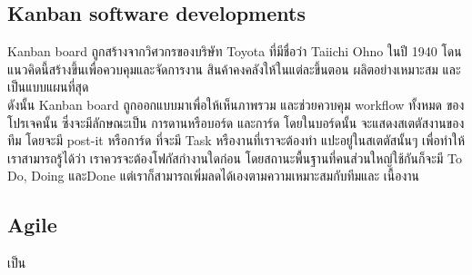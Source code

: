 \documentclass[12pt,oneside,openright,a4paper]{cpe-thai-project}
\begin{document}
\subsection{Kanban software developments} 
\hspace*{1cm}Kanban board \cite{WhatIsKanban, KanbanConcept} ถูกสร้างจากวิศวกรของบริษัท Toyota ที่มีชื่อว่า Taiichi Ohno ในปี 1940 โดนแนวคิดนี้สร้างขึ้นเพื่อควบคุมและจัดการงาน สินค้าคงคลังให้ในแต่ละขึ้นตอน ผลิตอย่างเหมาะสม และเป็นแบบแผนที่สุด\\
\hspace*{1cm}ดังนั้น Kanban board ถูกออกแบบมาเพื่อให้เห็นภาพรวม และช่วยควบคุม workflow ทั้งหมด ของโปรเจคนั้น ซึ่งจะมีลักษณะเป็น การดานหรือบอร์ด และการ์ด โดยในบอร์ดนั้น จะแสดงสเตตัสงานของทีม โดยจะมี post-it หรือการ์ด ที่จะมี Task หรืองานที่เราจะต้องทำ แปะอยู่ในสเตตัสนั้นๆ เพื่อทำให้เราสามารถรู้ได้ว่า เราควรจะต้องโฟกัสกำงานใดก่อน โดยสถานะพื้นฐานที่คนส่วนใหญ่ใช้กันก็จะมี To Do, Doing และDone แต่เราก็สามารถเพิ่มลดได้เองตามความเหมาะสมกับทีมและ เนื้องาน

\subsection{Agile}
\hspace*{1cm} เป็น
\end{document}
